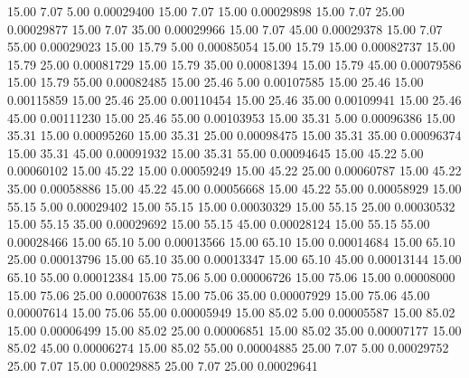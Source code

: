     15.00      7.07      5.00     0.00029400
     15.00      7.07     15.00     0.00029898
     15.00      7.07     25.00     0.00029877
     15.00      7.07     35.00     0.00029966
     15.00      7.07     45.00     0.00029378
     15.00      7.07     55.00     0.00029023
     15.00     15.79      5.00     0.00085054
     15.00     15.79     15.00     0.00082737
     15.00     15.79     25.00     0.00081729
     15.00     15.79     35.00     0.00081394
     15.00     15.79     45.00     0.00079586
     15.00     15.79     55.00     0.00082485
     15.00     25.46      5.00     0.00107585
     15.00     25.46     15.00     0.00115859
     15.00     25.46     25.00     0.00110454
     15.00     25.46     35.00     0.00109941
     15.00     25.46     45.00     0.00111230
     15.00     25.46     55.00     0.00103953
     15.00     35.31      5.00     0.00096386
     15.00     35.31     15.00     0.00095260
     15.00     35.31     25.00     0.00098475
     15.00     35.31     35.00     0.00096374
     15.00     35.31     45.00     0.00091932
     15.00     35.31     55.00     0.00094645
     15.00     45.22      5.00     0.00060102
     15.00     45.22     15.00     0.00059249
     15.00     45.22     25.00     0.00060787
     15.00     45.22     35.00     0.00058886
     15.00     45.22     45.00     0.00056668
     15.00     45.22     55.00     0.00058929
     15.00     55.15      5.00     0.00029402
     15.00     55.15     15.00     0.00030329
     15.00     55.15     25.00     0.00030532
     15.00     55.15     35.00     0.00029692
     15.00     55.15     45.00     0.00028124
     15.00     55.15     55.00     0.00028466
     15.00     65.10      5.00     0.00013566
     15.00     65.10     15.00     0.00014684
     15.00     65.10     25.00     0.00013796
     15.00     65.10     35.00     0.00013347
     15.00     65.10     45.00     0.00013144
     15.00     65.10     55.00     0.00012384
     15.00     75.06      5.00     0.00006726
     15.00     75.06     15.00     0.00008000
     15.00     75.06     25.00     0.00007638
     15.00     75.06     35.00     0.00007929
     15.00     75.06     45.00     0.00007614
     15.00     75.06     55.00     0.00005949
     15.00     85.02      5.00     0.00005587
     15.00     85.02     15.00     0.00006499
     15.00     85.02     25.00     0.00006851
     15.00     85.02     35.00     0.00007177
     15.00     85.02     45.00     0.00006274
     15.00     85.02     55.00     0.00004885
     25.00      7.07      5.00     0.00029752
     25.00      7.07     15.00     0.00029885
     25.00      7.07     25.00     0.00029641
